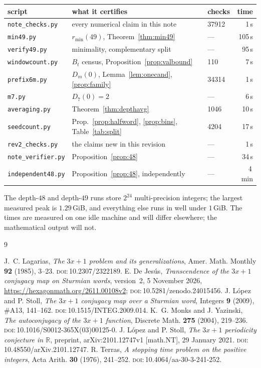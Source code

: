 \documentclass[11pt,a4paper]{article}
\theoremstyle{plain}
\theoremstyle{definition}
\theoremstyle{remark}
\begin{document}
\begin{center}\small
\begin{tabular}{lllr}
\toprule
script & what it certifies & checks & time\\
\midrule
\texttt{note\_checks.py} & every numerical claim in this note & 37912 & 1\,s\\
\texttt{min49.py} & $r_{\min}(49)$, Theorem~\ref{thm:min49} & --- & 105\,s\\
\texttt{verify49.py} & minimality, complementary split & --- & 95\,s\\
\texttt{windowcount.py} & $B_t$ census, Proposition~\ref{prop:valbound} & 110 & 7\,s\\
\texttt{prefix6m.py} & $D_m(0)$, Lemma~\ref{lem:onecand}, \ref{prop:family} & 34314 & 1\,s\\
\texttt{m7.py} & $D_7(0)=2$ & --- & 6\,s\\
\texttt{averaging.py} & Theorem~\ref{thm:depthavg} & 1046 & 10\,s\\
\texttt{seedcount.py} & Prop.~\ref{prop:halfword}, \ref{prop:bins}, Table~\ref{tab:split} & 4204 & 17\,s\\
\texttt{rev2\_checks.py} & the claims new in this revision & --- & 1\,s\\
\texttt{note\_verifier.py} & Proposition~\ref{prop:48} & --- & 34\,s\\
\texttt{independent48.py} & Proposition~\ref{prop:48}, independently & --- & 4\,min\\
\bottomrule
\end{tabular}
\end{center}

The depth-$48$ and depth-$49$ runs store $2^{24}$ multi-precision integers; the
largest measured peak is $1.29$\,GiB, and everything else runs in well under
$1$\,GiB. The times are measured on one idle machine and will differ
elsewhere; the mathematical output will not.

\begin{thebibliography}{9}
\raggedright
{} J.~C. Lagarias, \emph{The $3x+1$ problem and its
generalizations}, Amer. Math. Monthly \textbf{92} (1985), 3--23.
\textsc{doi:}\,10.2307/2322189.
 E. De Jes\'us, \emph{Transcendence of the $3x+1$
conjugacy map on Sturmian words}, version~2, 5 November 2026,
\url{https://hexagonmath.org/2611.00108v2};
\textsc{doi:}\,10.5281/zenodo.24015456.
 J. L\'opez and P. Stoll, \emph{The $3x+1$ conjugacy
map over a Sturmian word}, Integers \textbf{9} (2009), \#A13, 141--162.
\textsc{doi:}\,10.1515/INTEG.2009.014.
 K.~G. Monks and J. Yazinski, \emph{The
autoconjugacy of the $3x+1$ function}, Discrete Math. \textbf{275} (2004),
219--236. \textsc{doi:}\,10.1016/S0012-365X(03)00125-0.
 J. L\'opez and P. Stoll, \emph{The $3x+1$ periodicity
conjecture in $\mathbb{R}$}, preprint, arXiv:2101.12747v1 [math.NT], 29 January
2021. \textsc{doi:}\,10.48550/arXiv.2101.12747.
 R. Terras, \emph{A stopping time problem on the positive
integers}, Acta Arith. \textbf{30} (1976), 241--252.
\textsc{doi:}\,10.4064/aa-30-3-241-252.

\end{thebibliography}
\end{document}
